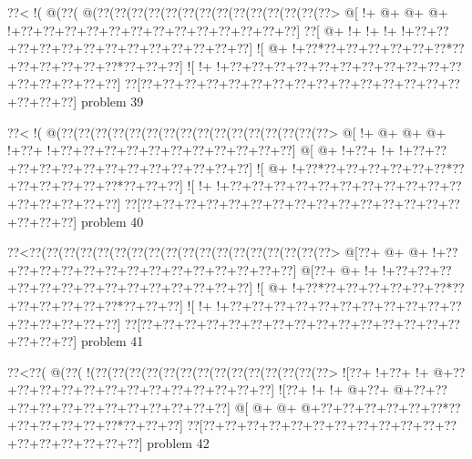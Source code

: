 \vbox{\vbox{\goo
\0??<\- !(\- @(\0??(\- @(\0??(\0??(\0??(\0??(\0??(\0??(\0??(\0??(\0??(\0??(\0??(\0??(\0??(\0??>
\- @[\- !+\- @+\- @+\- @+\- !+\0??+\0??+\0??+\0??+\0??+\0??+\0??+\0??+\0??+\0??+\0??+\0??+\0??]
\0??[\- @+\- !+\- !+\- !+\- !+\0??+\0??+\0??+\0??+\0??+\0??+\0??+\0??+\0??+\0??+\0??+\0??+\0??]
\- ![\- @+\- !+\0??*\0??+\0??+\0??+\0??+\0??+\0??*\0??+\0??+\0??+\0??+\0??+\0??*\0??+\0??+\0??]
\- ![\- !+\- !+\0??+\0??+\0??+\0??+\0??+\0??+\0??+\0??+\0??+\0??+\0??+\0??+\0??+\0??+\0??+\0??]
\0??[\0??+\0??+\0??+\0??+\0??+\0??+\0??+\0??+\0??+\0??+\0??+\0??+\0??+\0??+\0??+\0??+\0??+\0??]
}
\hfil problem 39\hfil\break
}



\vbox{\vbox{\goo
\0??<\- !(\- @(\0??(\0??(\0??(\0??(\0??(\0??(\0??(\0??(\0??(\0??(\0??(\0??(\0??(\0??(\0??(\0??>
\- @[\- !+\- @+\- @+\- @+\- !+\0??+\- !+\0??+\0??+\0??+\0??+\0??+\0??+\0??+\0??+\0??+\0??+\0??]
\- @[\- @+\- !+\0??+\- !+\- !+\0??+\0??+\0??+\0??+\0??+\0??+\0??+\0??+\0??+\0??+\0??+\0??+\0??]
\- ![\- @+\- !+\0??*\0??+\0??+\0??+\0??+\0??+\0??*\0??+\0??+\0??+\0??+\0??+\0??*\0??+\0??+\0??]
\- ![\- !+\- !+\0??+\0??+\0??+\0??+\0??+\0??+\0??+\0??+\0??+\0??+\0??+\0??+\0??+\0??+\0??+\0??]
\0??[\0??+\0??+\0??+\0??+\0??+\0??+\0??+\0??+\0??+\0??+\0??+\0??+\0??+\0??+\0??+\0??+\0??+\0??]
}
\hfil problem 40\hfil\break
}



\vbox{\vbox{\goo
\0??<\0??(\0??(\0??(\0??(\0??(\0??(\0??(\0??(\0??(\0??(\0??(\0??(\0??(\0??(\0??(\0??(\0??(\0??>
\- @[\0??+\- @+\- @+\- !+\0??+\0??+\0??+\0??+\0??+\0??+\0??+\0??+\0??+\0??+\0??+\0??+\0??+\0??]
\- @[\0??+\- @+\- !+\- !+\0??+\0??+\0??+\0??+\0??+\0??+\0??+\0??+\0??+\0??+\0??+\0??+\0??+\0??]
\- ![\- @+\- !+\0??*\0??+\0??+\0??+\0??+\0??+\0??*\0??+\0??+\0??+\0??+\0??+\0??*\0??+\0??+\0??]
\- ![\- !+\- !+\0??+\0??+\0??+\0??+\0??+\0??+\0??+\0??+\0??+\0??+\0??+\0??+\0??+\0??+\0??+\0??]
\0??[\0??+\0??+\0??+\0??+\0??+\0??+\0??+\0??+\0??+\0??+\0??+\0??+\0??+\0??+\0??+\0??+\0??+\0??]
}
\hfil problem 41\hfil\break
}



\vbox{\vbox{\goo
\0??<\0??(\- @(\0??(\- !(\0??(\0??(\0??(\0??(\0??(\0??(\0??(\0??(\0??(\0??(\0??(\0??(\0??(\0??>
\- ![\0??+\- !+\0??+\- !+\- @+\0??+\0??+\0??+\0??+\0??+\0??+\0??+\0??+\0??+\0??+\0??+\0??+\0??]
\- ![\0??+\- !+\- !+\- @+\0??+\- @+\0??+\0??+\0??+\0??+\0??+\0??+\0??+\0??+\0??+\0??+\0??+\0??]
\- @[\- @+\- @+\- @+\0??+\0??+\0??+\0??+\0??+\0??*\0??+\0??+\0??+\0??+\0??+\0??*\0??+\0??+\0??]
\0??[\0??+\0??+\0??+\0??+\0??+\0??+\0??+\0??+\0??+\0??+\0??+\0??+\0??+\0??+\0??+\0??+\0??+\0??]
}
\hfil problem 42\hfil\break
}



